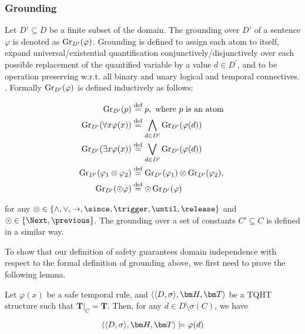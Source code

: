 \subsubsection{Grounding}

Let $D'\subseteq D$ be a finite subset of the domain. The
grounding over $D'$ of a sentence $\varphi$ is denoted as
$\operatorname{Gr}_{D'}(\varphi)$. Grounding is defined to assign each atom to
itself, expand universal/existential quantification
conjunctively/disjunctively over each possible replacement of the
quantified variable by a value $d \in D^\prime$, and to be operation
preserving w.r.t. all binary and unary logical and temporal
connectives. \cite{agcapevidi17a}. Formally
$\operatorname{Gr}_{D^{\prime}}(\varphi)$ is defined inductively as follows:

\begin{align*}
  \operatorname{Gr}_{D^{\prime}}(p) & \stackrel{\text{def}}{=} p, \text { where } p \text { is an atom } \\
  \operatorname{Gr}_{D^{\prime}}(\forall x \varphi(x)) & \stackrel{\text{def}}{=} \bigwedge_{d \in D^{\prime}} \operatorname{Gr}_{D^{\prime}}(\varphi(d)) \\
  \operatorname{Gr}_{D^{\prime}}(\exists x \varphi(x)) & \stackrel{\text{def}}{=} \bigvee_{d \in D^{\prime}} \operatorname{Gr}_{D^{\prime}}(\varphi(d)) \\
  \operatorname{Gr}_{D^{\prime}}(\varphi_1 \otimes \varphi_2) & \stackrel{\text{def}}{=} \operatorname{Gr}_{D^{\prime}}(\varphi_1) \otimes \operatorname{Gr}_{D^{\prime}}(\varphi_2), \\
  \operatorname{Gr}_{D^{\prime}}(\odot \varphi) & \stackrel{\text{def}}{=} \odot \operatorname{Gr}_{D^{\prime}}(\varphi) \\
\end{align*}

for any
$\otimes \in \{ \land, \lor, \rightarrow, \since, \trigger, \until,
\release \}$ and $\odot \in \{ \Next, \previous \}$. The grounding
over a set of constants $C' \subseteq C$ is defined in a similar way.

To show that our definition of safety guarantees domain independence
with respect to the formal definition of grounding above, we first
need to prove the following lemma.

\begin{lemma}\label{lemma:not-imsigma-domain-sat}
  Let $\varphi(x)$ be a safe temporal rule, and $\qthandt$ be a
  TQHT structure such that $\bm{T}\vert_{C}=\bm{T}$. Then, for any
  $d \in D \setminus \sigma(C)$, we have

  \begin{equation*}
    \qthandt \models \varphi(d)
  \end{equation*}
  
\end{lemma}

